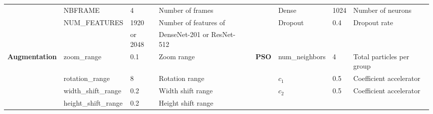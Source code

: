 \documentclass[fleqn,10pt]{wlscirep}
\begin{document}
\begin{table}[htb]
{\begin{tabular}{l|l|l|l|lllll}
\multicolumn{1}{|l|}{}                      & NBFRAME                   & 4              & Number of frames           & \multicolumn{1}{l|}{} & \multicolumn{1}{l|}{}                        & \multicolumn{1}{l|}{Dense}                     & \multicolumn{1}{l|}{1024}           & \multicolumn{1}{l|}{Number of neurons}       \\ \cline{2-4} \cline{7-9} 
\multicolumn{1}{|l|}{}                      & NUM\_FEATURES              & 1920           & Number of features of      & \multicolumn{1}{l|}{} & \multicolumn{1}{l|}{\textbf{}}               & \multicolumn{1}{l|}{Dropout}                   & \multicolumn{1}{l|}{0.4}            & \multicolumn{1}{l|}{Dropout rate}            \\
\multicolumn{1}{|l|}{}                      &                           & or 2048        & DenseNet-201 or ResNet-512 & \multicolumn{1}{l|}{} & \multicolumn{1}{l|}{}                        & \multicolumn{1}{l|}{}                          & \multicolumn{1}{l|}{}               & \multicolumn{1}{l|}{}                        \\ \cline{1-4} \cline{6-9} 
\multicolumn{1}{|l|}{\textbf{Augmentation}} & zoom\_range                & 0.1            & Zoom range                 & \multicolumn{1}{l|}{} & \multicolumn{1}{l|}{\textbf{PSO}}                     & \multicolumn{1}{l|}{num\_neighbors}             & \multicolumn{1}{l|}{4}              & \multicolumn{1}{l|}{Total particles per group}     \\ \cline{2-4} \cline{7-9} 
\multicolumn{1}{|l|}{}                      & rotation\_range            & 8              & Rotation range             & \multicolumn{1}{l|}{} & \multicolumn{1}{l|}{}                        & \multicolumn{1}{l|}{$c_1$}                        & \multicolumn{1}{l|}{0.5}            & \multicolumn{1}{l|}{Coefficient accelerator} \\ \cline{2-4} \cline{7-9} 
\multicolumn{1}{|l|}{}                      & width\_shift\_range         & 0.2            & Width shift range          & \multicolumn{1}{l|}{} & \multicolumn{1}{l|}{}                        & \multicolumn{1}{l|}{$c_2$}                        & \multicolumn{1}{l|}{0.5}            & \multicolumn{1}{l|}{Coefficient accelerator} \\ \cline{2-4} \cline{6-9} 
\multicolumn{1}{|l|}{}                      & height\_shift\_range        & 0.2            & Height shift range         &                       &                                              &                                                &                                     &                                              \\ \cline{2-4}

\end{tabular}}
\end{table}
\end{document}
